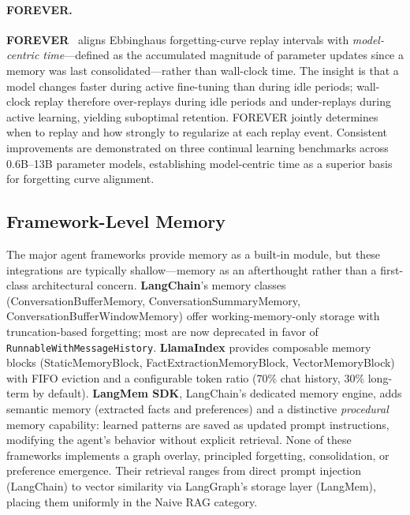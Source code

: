 \paragraph{FOREVER.}
\textbf{FOREVER}~\cite{forever2026} aligns Ebbinghaus forgetting-curve
replay intervals with \emph{model-centric time}---defined as the
accumulated magnitude of parameter updates since a memory was last
consolidated---rather than wall-clock time.  The insight is that a
model changes faster during active fine-tuning than during idle
periods; wall-clock replay therefore over-replays during idle periods
and under-replays during active learning, yielding suboptimal
retention.  FOREVER jointly determines when to replay and how strongly
to regularize at each replay event.  Consistent improvements are
demonstrated on three continual learning benchmarks across 0.6B--13B
parameter models, establishing model-centric time as a superior basis
for forgetting curve alignment.

\subsection{Framework-Level Memory}
\label{sec:framework}

The major agent frameworks provide memory as a built-in module, but
these integrations are typically shallow---memory as an afterthought
rather than a first-class architectural concern. \textbf{LangChain}'s
memory classes (ConversationBufferMemory, ConversationSummaryMemory,
ConversationBufferWindowMemory) offer working-memory-only storage with
truncation-based forgetting; most are now deprecated in favor of
\texttt{RunnableWithMessageHistory}. \textbf{LlamaIndex} provides
composable memory blocks (StaticMemoryBlock,
FactExtractionMemoryBlock, VectorMemoryBlock) with FIFO eviction and
a configurable token ratio (70\% chat history, 30\% long-term by
default). \textbf{LangMem SDK}, LangChain's dedicated memory engine,
adds semantic memory (extracted facts and preferences) and a
distinctive \emph{procedural} memory capability: learned patterns are
saved as updated prompt instructions, modifying the agent's behavior
without explicit retrieval. None of these frameworks implements a
graph overlay, principled forgetting, consolidation, or preference
emergence. Their retrieval ranges from direct prompt injection
(LangChain) to vector similarity via LangGraph's storage layer
(LangMem), placing them uniformly in the Naive RAG category.

